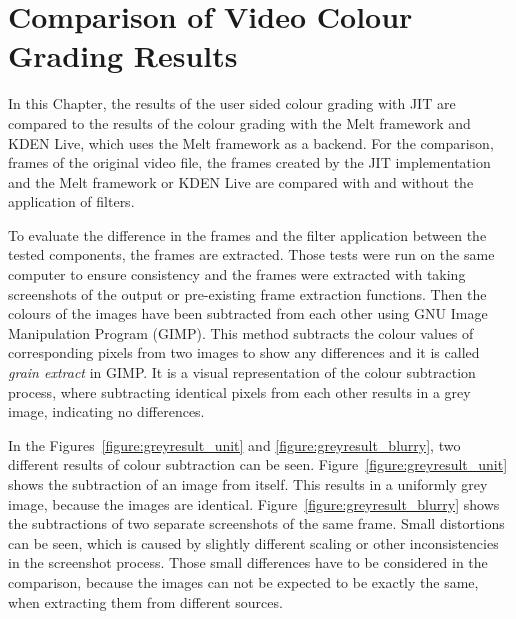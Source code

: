 \documentclass[../MasterThesis.tex]{subfiles}
\begin{document}
	
	
%
%
%
%
%
%
%
%
\newpage
\section{Comparison of Video Colour Grading Results} \label{section:experimentalevaluationanddiscussion}  


In this Chapter, the results of the user sided colour grading with JIT are compared to the results of the colour grading with the Melt framework and KDEN Live, which uses the Melt framework as a backend. For the comparison, frames of the original video file, the frames created by the JIT implementation and the Melt framework or KDEN Live are compared with and without the application of filters.


To evaluate the difference in the frames and the filter application between the tested components, the frames are extracted. Those tests were run on the same computer to ensure consistency and the frames were extracted with taking screenshots of the output or pre-existing frame extraction functions.
Then the colours of the images have been subtracted from each other using GNU Image Manipulation Program (GIMP). 
This method subtracts the colour values of corresponding pixels from two images to show any differences and it is called \textit{grain extract} in GIMP. It is a visual representation of the colour subtraction process, where subtracting identical pixels from each other results in a grey image, indicating no differences.~\cite{gimp}


In the Figures~\ref{figure:greyresult_unit} and \ref{figure:greyresult_blurry}, two different results of colour subtraction can be seen. Figure~\ref{figure:greyresult_unit} shows the subtraction of an image from itself. This results in a uniformly grey image, because the images are identical. Figure~\ref{figure:greyresult_blurry} shows the subtractions of two separate screenshots of the same frame. Small distortions can be seen, which is caused by slightly different scaling or other inconsistencies in the screenshot process. Those small differences have to be considered in the comparison, because the images can not be expected to be exactly the same, when extracting them from different sources.
\end{document}
